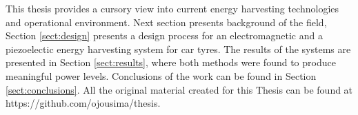 This thesis provides a cursory view into current energy harvesting technologies and operational environment. Next section presents background of the field, Section \ref{sect:design} presents a design process for an electromagnetic and a piezoelectic energy harvesting system for car tyres. The results of the systems are presented in Section \ref{sect:results}, where both methods were found to produce meaningful power levels. Conclusions of the work can be found in Section \ref{sect:conclusions}. All the original material created for this Thesis can be found at https://github.com/ojousima/thesis. 
